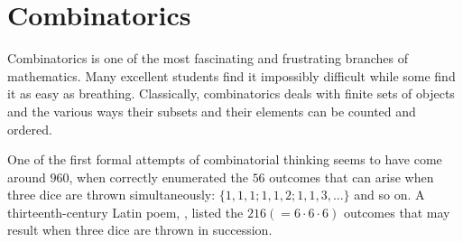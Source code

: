 \chapter{Combinatorics}\label{combi}





Combinatorics is one of the most fascinating and frustrating branches of mathematics. Many excellent students find it impossibly difficult while some find it as easy as breathing. Classically, combinatorics deals with finite sets of objects and the various ways their subsets and their elements can be counted and ordered.

One of the first formal attempts of combinatorial thinking seems to have come around $960$, when  correctly enumerated the $56$ outcomes that can arise when three dice are thrown simultaneously: $\{1, 1, 1; 1, 1, 2; 1, 1, 3, ...\}$ and so on. A thirteenth-century Latin poem, , listed the $216 (= 6 \cdot 6 \cdot 6)$ outcomes that may result when three dice are thrown in succession.

